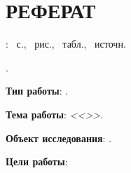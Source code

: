 \chapter*{РЕФЕРАТ}
\doctype\xspace: ~с., ~рис., ~табл., ~источн.%

\vspace{3mm}

\MakeUppercase{\keywordsru}.

\Preface

\textbf{Тип работы}: \doctype.

\textbf{Тема работы}: \textit{<<\Title>>}.

\textbf{Объект исследования}: \ObjectOfResearch.


\textbf{Цели работы}: \GoalOfResearch

\SubtasksPerformed


